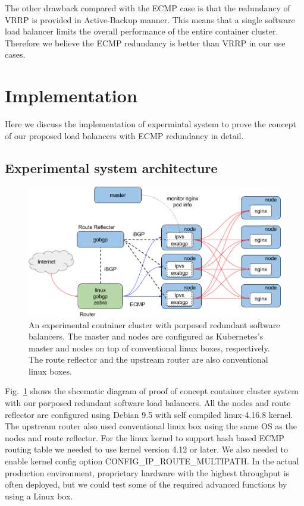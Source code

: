 The other drawback compared with the ECMP case is that the redundancy of VRRP is provided in Active-Backup manner.
This means that a single software load balancer limits the overall performance of the entire container cluster.
Therefore we believe the ECMP redundancy is better than VRRP in our use cases.

\section{Implementation}\label{Implementation}

Here we discuss the implementation of expermintal system to prove the concept of our proposed load balancers with ECMP redundancy in detail.

\subsection{Experimental system architecture}

\begin{figure}[tb]
\begin{center}
\includegraphics[width=\columnwidth]{Figs/poc.png}
\end{center}
\caption{
  An experimental container cluster with porposed redundant software balancers.
  The master and nodes are configured as Kubernetes's master and nodes on top of conventional linux boxes, respectively.
  The route reflector and the upstream router are also conventional linux boxes.
}
\label{fig:poc}
\end{figure}

Fig.~\ref{fig:poc} shows the shcematic diagram of proof of concept container cluster system with our porposed redundant software load balancers.
All the nodes and route reflector are configured using Debian 9.5 with self compiled linux-4.16.8 kernel.  
The upstream router also used conventional linux box using the same OS as the nodes and route reflector.
For the linux kernel to support hash based ECMP routing table we needed to use kernel version 4.12 or later.
We also needed to enable kernel config option CONFIG\_IP\_ROUTE\_MULTIPATH\cite{ip-sysctl}.
In the actual production environment, proprietary hardware with the highest throughput is often deployed, but we could test some of the required advanced functions by using a Linux box.

